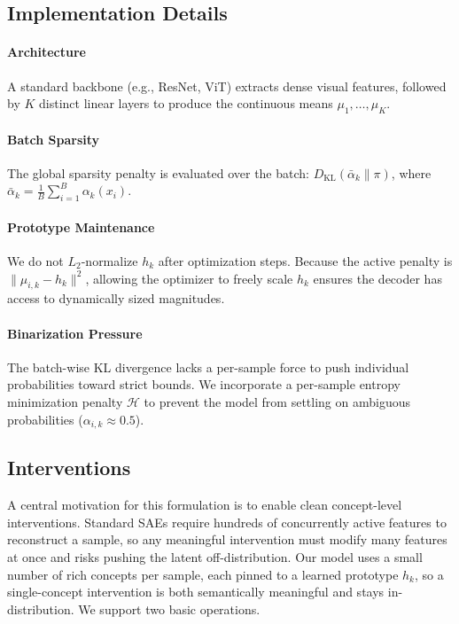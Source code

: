 \documentclass[11pt, a4paper]{article}
\begin{document}
\subsection{Implementation Details}

\paragraph{Architecture}
A standard backbone (e.g., ResNet, ViT) extracts dense visual features, followed by $K$ distinct linear layers to produce the continuous means $\mu_1, \dots, \mu_K$.

\paragraph{Batch Sparsity}
The global sparsity penalty is evaluated over the batch: $D_{\mathrm{KL}}(\bar{\alpha}_k \parallel \pi)$, where $\bar{\alpha}_k = \frac{1}{B} \sum_{i=1}^B \alpha_k(x_i)$.

\paragraph{Prototype Maintenance}
We do not $L_2$-normalize $h_k$ after optimization steps. Because the active penalty is $\|\mu_{i,k} - h_k\|^2$, allowing the optimizer to freely scale $h_k$ ensures the decoder has access to dynamically sized magnitudes.

\paragraph{Binarization Pressure}
The batch-wise KL divergence lacks a per-sample force to push individual probabilities toward strict bounds. We incorporate a per-sample entropy minimization penalty $\mathcal{H}$ to prevent the model from settling on ambiguous probabilities ($\alpha_{i,k} \approx 0.5$).

\subsection{Interventions}

A central motivation for this formulation is to enable clean concept-level interventions. Standard SAEs require hundreds of concurrently active features to reconstruct a sample, so any meaningful intervention must modify many features at once and risks pushing the latent off-distribution. Our model uses a small number of rich concepts per sample, each pinned to a learned prototype $h_k$, so a single-concept intervention is both semantically meaningful and stays in-distribution. We support two basic operations.
\end{document}
